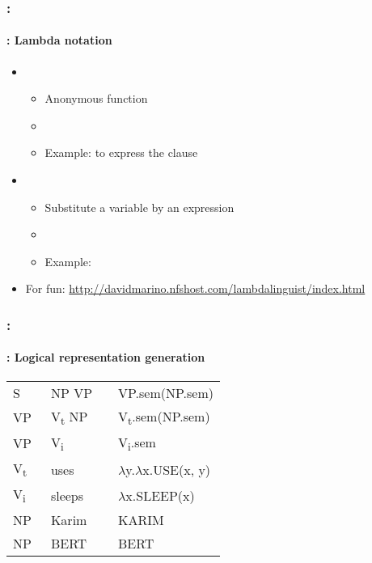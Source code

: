 \documentclass[xcolor=table]{beamer}
\begin{document}
\begin{frame}
	\frametitle{\insertshortsubtitle: \insertsection}
	\framesubtitle{\insertsubsection: Lambda notation}
	
	\begin{itemize}
		\item {}
		\begin{itemize}
			\item Anonymous function
			\item {}
			\item Example:  to express the clause 
		\end{itemize}
		
		\item {}
		\begin{itemize}
			\item Substitute a variable by an expression
			\item \keyword{$ \phi (\psi) $}
			\item Example: 
		\end{itemize}
		
		\item For fun: \url{http://davidmarino.nfshost.com/lambdalinguist/index.html}
	\end{itemize}
	
\end{frame}

\begin{frame}
	\frametitle{\insertshortsubtitle: \insertsection}
	\framesubtitle{\insertsubsection: Logical representation generation}
	
	\begin{center}
		\small\bfseries
		\begin{tabular}{llll}
			\hline\hline
			S  & \textrightarrow\ NP VP && VP.sem(NP.sem) \\
			VP & \textrightarrow\ V\textsubscript{t} NP && V\textsubscript{t}.sem(NP.sem)\\
			VP & \textrightarrow\ V\textsubscript{i} && V\textsubscript{i}.sem \\
			V\textsubscript{t}  & \textrightarrow\ uses && $ \lambda $y.$ \lambda $x.USE(x, y) \\
			V\textsubscript{i}  & \textrightarrow\ sleeps && $ \lambda $x.SLEEP(x) \\
			NP  & \textrightarrow\  Karim && KARIM \\
			NP  & \textrightarrow\  BERT && BERT \\
			\hline\hline
		\end{tabular}
		
	\end{center}
\end{frame}
\end{document}
